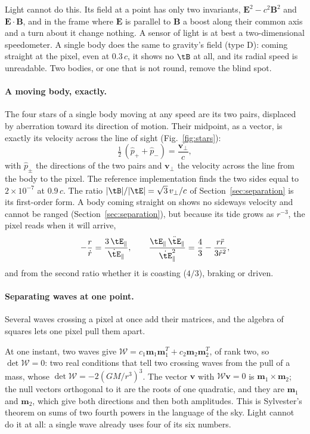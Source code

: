 Light cannot do this. Its field at a point has only two invariants,
$\mathbf{E}^2 - c^2\mathbf{B}^2$ and $\mathbf{E}\cdot\mathbf{B}$, and in the frame
where $\mathbf{E}$ is parallel to $\mathbf{B}$ a boost along their common axis
and a turn about it change nothing. A sensor of light is at best a
two-dimensional speedometer. A single body does the same to gravity's field
(type D): coming straight at the pixel, even at $0.3\,c$, it shows no $\tB$ at
all, and its radial speed is unreadable. Two bodies, or one that is not round,
remove the blind spot.

\paragraph{A moving body, exactly.} The four stars of a single body moving at any
speed are its two pairs, displaced by aberration toward its direction of motion.
Their midpoint, as a vector, is exactly its velocity across the line of sight
(Fig.~\ref{fig:stars}):
\begin{equation}\label{eq:star-velocity}
\tfrac12\,(\hat p_+ + \hat p_-) = \frac{\mathbf{v}_\perp}{c} ,
\end{equation}
with $\hat p_\pm$ the directions of the two pairs and $\mathbf{v}_\perp$ the
velocity across the line from the body to the pixel. The reference
implementation finds the two sides equal to $2\times10^{-7}$ at $0.9\,c$. The
ratio $|\tB|/|\tE| = \sqrt3\,v_\perp/c$ of Section~\ref{sec:separation} is its
first-order form. A body coming straight on shows no sideways velocity and
cannot be ranged (Section~\ref{sec:separation}), but because its tide grows as
$r^{-3}$, the pixel reads when it will arrive,
\begin{equation}\label{eq:contact}
-\frac{r}{\dot r} = \frac{3\,\tE_\parallel}{\dot{\tE}_\parallel},
\qquad
\frac{\tE_\parallel\,\ddot{\tE}_\parallel}{\dot{\tE}_\parallel^2} = \frac43 - \frac{r\ddot r}{3\dot r^2},
\end{equation}
and from the second ratio whether it is coasting ($4/3$), braking or driven.

\paragraph{Separating waves at one point.} Several waves crossing a pixel at
once add their matrices, and the algebra of squares lets one pixel pull them
apart.

At one instant, two waves give $\mathcal{W} = c_1\mathbf{m}_1\mathbf{m}_1^{T} +
c_2\mathbf{m}_2\mathbf{m}_2^{T}$, of rank two, so $\det\mathcal{W} = 0$: two real
conditions that tell two crossing waves from the pull of a mass, whose
$\det\mathcal{W} = -2(GM/r^3)^3$. The vector $\mathbf{v}$ with $\mathcal{W}\mathbf{v} = 0$ is
$\mathbf{m}_1\times\mathbf{m}_2$; the null vectors orthogonal to it are the
roots of one quadratic, and they are $\mathbf{m}_1$ and $\mathbf{m}_2$, which give
both directions and then both amplitudes. This is Sylvester's theorem on sums of
two fourth powers \cite{Sylvester1851} in the language of the sky. Light cannot
do it at all: a single wave already uses four of its six numbers.


